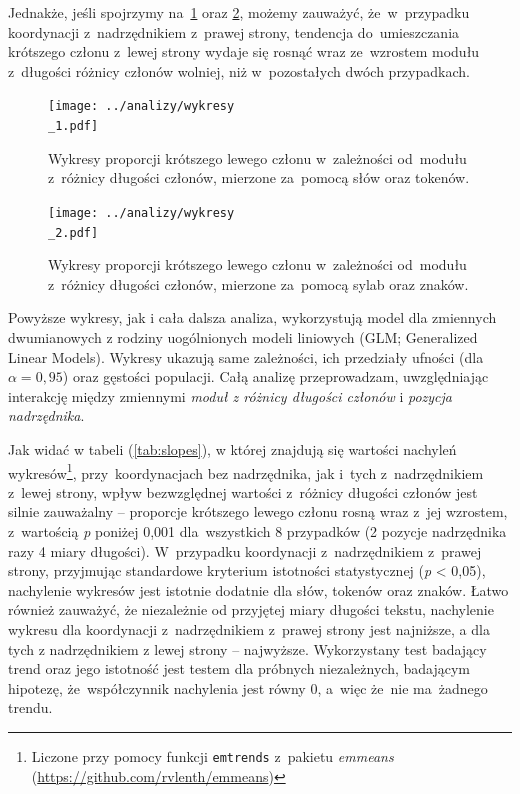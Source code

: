 \documentclass[licencjacka]{pracamgr_Kogni}
\begin{document}
Jednakże, jeśli spojrzymy na~\ref{wykresy} oraz \ref{wykresy2}, możemy zauważyć, że~w~przypadku koordynacji z~nadrzędnikiem z~prawej strony, tendencja do~umieszczania krótszego członu z~lewej strony wydaje się rosnąć wraz ze~wzrostem modułu z~długości różnicy członów wolniej, niż w~pozostałych dwóch przypadkach. 
\begin{figure}
    \centering
    \texttt{[image: ../analizy/wykresy\\\_1.pdf]}
    \caption[b]{Wykresy proporcji krótszego lewego członu w~zależności od~modułu z~różnicy długości członów, mierzone za~pomocą słów oraz tokenów.}
    \label{wykresy}
\end{figure}
\begin{figure}
    \centering
    \texttt{[image: ../analizy/wykresy\\\_2.pdf]}
    \caption[b]{Wykresy proporcji krótszego lewego członu w~zależności od~modułu z~różnicy długości członów, mierzone za~pomocą sylab oraz znaków.}
    \label{wykresy2}
\end{figure}
\newpage

Powyższe wykresy, jak i cała dalsza analiza, wykorzystują model dla zmiennych dwumianowych z rodziny uogólnionych modeli liniowych (GLM; Generalized Linear Models). Wykresy ukazują same zależności, ich przedziały ufności (dla $\alpha = 0,95$) oraz gęstości populacji.
Całą analizę przeprowadzam, uwzględniając interakcję między zmiennymi \textit{moduł z różnicy długości członów} i \textit{pozycja nadrzędnika}.

Jak widać w tabeli (\ref{tab:slopes}), w której znajdują się wartości nachyleń wykresów\footnote{Liczone przy pomocy funkcji \texttt{emtrends} z~pakietu \textit{emmeans} (\url{https://github.com/rvlenth/emmeans})}, przy~koordynacjach bez nadrzędnika, jak i~tych z~nadrzędnikiem z~lewej strony, wpływ bezwzględnej wartości z~różnicy długości członów jest silnie zauważalny -- proporcje krótszego lewego członu rosną wraz z~jej wzrostem, z~wartością \textit{p} poniżej 0,001 dla~wszystkich 8 przypadków (2 pozycje nadrzędnika razy 4 miary długości). 
W~przypadku koordynacji z~nadrzędnikiem z~prawej strony, przyjmując standardowe kryterium istotności statystycznej (\textit{p} < 0,05), nachylenie wykresów jest istotnie dodatnie dla słów, tokenów oraz znaków.
Łatwo również zauważyć, że niezależnie od przyjętej miary długości tekstu, nachylenie wykresu dla koordynacji z~nadrzędnikiem z~prawej strony jest najniższe, a dla tych z nadrzędnikiem z lewej strony -- najwyższe.
Wykorzystany test badający trend oraz jego istotność jest testem dla próbnych niezależnych, badającym hipotezę, że~współczynnik nachylenia jest równy 0, a~więc że~nie ma~żadnego trendu.
\end{document}
